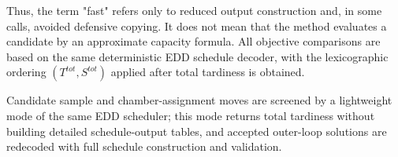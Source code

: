 Thus, the term "fast" refers only to reduced output construction and, in some
calls, avoided defensive copying. It does not mean that the method evaluates a
candidate by an approximate capacity formula. All objective comparisons are
based on the same deterministic EDD schedule decoder, with the lexicographic
ordering \((T^{tot},S^{tot})\) applied after total tardiness is obtained.


Candidate sample and chamber-assignment moves are screened by a lightweight
mode of the same EDD scheduler; this mode returns total tardiness without
building detailed schedule-output tables, and accepted outer-loop solutions are
redecoded with full schedule construction and validation.
